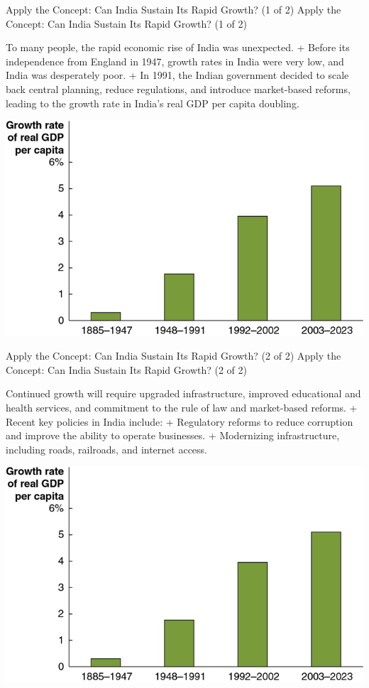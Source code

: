 \documentclass[
  12pt,
  ignorenonframetext,
]{beamer}
\begin{document}
\begin{frame}{Apply the Concept: Can India Sustain Its Rapid Growth? (1
of 2)}
\label{apply-the-concept-can-india-sustain-its-rapid-growth-1-of-2}
Apply the Concept: Can India Sustain Its Rapid Growth? (1 of 2)

To many people, the rapid economic rise of India was unexpected. +
Before its independence from England in 1947, growth rates in India were
very low, and India was desperately poor. + In 1991, the Indian
government decided to scale back central planning, reduce regulations,
and introduce market-based reforms, leading to the growth rate in
India's real GDP per capita doubling.

\includegraphics[width=\textwidth,height=0.99\textheight]{imgs3/img_slide15a.png}
\end{frame}

\begin{frame}{Apply the Concept: Can India Sustain Its Rapid Growth? (2
of 2)}
\label{apply-the-concept-can-india-sustain-its-rapid-growth-2-of-2}
Apply the Concept: Can India Sustain Its Rapid Growth? (2 of 2)

Continued growth will require upgraded infrastructure, improved
educational and health services, and commitment to the rule of law and
market-based reforms. + Recent key policies in India include: +
Regulatory reforms to reduce corruption and improve the ability to
operate businesses. + Modernizing infrastructure, including roads,
railroads, and internet access.

\includegraphics[width=\textwidth,height=0.99\textheight]{imgs3/img_slide16a.png}
\end{frame}
\end{document}
